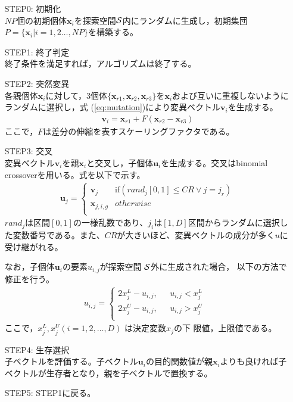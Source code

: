 \documentclass[a4paper,12pt]{jsreport}
\begin{document}
\begin{enumerate}

\item[STEP0:]\mbox{初期化}\\ 
$NP$個の初期個体$\bm{x}_i$を探索空間$\cal{S}$内にランダムに生成し，初期集団$P= \{ \bm{x}_i| i=1,2 \dots ,NP \}$を構築する。

\item[STEP1:]\mbox{終了判定}\\ 
終了条件を満足すれば，アルゴリズムは終了する。

\item[STEP2:]\mbox{突然変異}\\ 
各親個体$\bm{x}_i$に対して，3個体$ \{  \bm{x}_{r1},\bm{x}_{r2},\bm{x}_{r3}  \} $を$\bm{x}_i$および互いに重複しないようにランダムに選択し，式
(\ref{eq:mutation})により変異ベクトル$\bm{v}_i$を生成する。
 \begin{eqnarray}
 \bm{v}_i= \bm{x}_{r1}+ F (\bm{x}_{r2}-\bm{x}_{r3})
\label{eq:mutation}
\end{eqnarray}
ここで，$F$は差分の伸縮を表すスケーリングファクタである。

\item[STEP3:]\mbox{交叉}\\ 
変異ベクトル$\bm{v}_i$を親$\bm{x}_i$と交叉し，子個体$\bm{u}_{i}$を生成する。交叉はbinomial crossoverを用いる。式を以下で示す。
\begin{eqnarray}
\bm{u}_j=
\left\{
\begin{array}{cc}
    \bm{v}_j & \mbox{if$({rand}_j[0,1]\leq CR \vee j={j}_r)$}\\
    \bm{x}_{j,i,g} & \mbox{$otherwise$}\\
\end{array}
\right.
\end{eqnarray}
${rand}_j$は区間$[0,1]$の一様乱数であり、${j}_i$は$[1,D]$区間からランダムに選択した変数番号である。また、$CR$が大きいほど、変異ベクトルの成分が多く$u$に受け継がれる。

なお，子個体$\bm{u}_i$の要素$u_{i,j}$が探索空間 $\cal{S}$外に生成された場合，
以下の方法で修正を行う。
\begin{eqnarray}
u_{i,j} =
\left\{
\begin{array}{ll}
 2x^{L}_j-u_{i,j},  & \mbox{ $u_{i,j} <x^{L}_j $   } \\
  2x^{U}_j-u_{i,j},		   & \mbox{ $u_{i,j} >x^{U}_j $ } \\
\end{array}
\right.
\end{eqnarray}
ここで，$x^{L}_j, x^{U}_j (i = 1, 2, \dots ,D)$ は決定変数$x_j$の下
限値，上限値である。

\item[STEP4:]\mbox{生存選択}\\ 
子ベクトルを評価する。子ベクトル$\bm{u}_{i}$の目的関数値が親$\bm{x}_i$よりも良ければ子ベクトルが生存者となり，親を子ベクトルで置換する。

\item[STEP5:]\mbox{STEP1に戻る。}\\ 

\end{enumerate}
\end{document}
